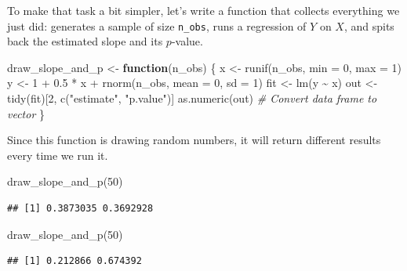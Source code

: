 \documentclass[
  12pt,
  oneside,openany]{book}
\newenvironment{Shaded}{\begin{snugshade}}{\end{snugshade}}
\newcommand{\AttributeTok}[1]{\textcolor[rgb]{0.77,0.63,0.00}{#1}}
\newcommand{\CommentTok}[1]{\textcolor[rgb]{0.56,0.35,0.01}{\textit{#1}}}
\newcommand{\ControlFlowTok}[1]{\textcolor[rgb]{0.13,0.29,0.53}{\textbf{#1}}}
\newcommand{\DecValTok}[1]{\textcolor[rgb]{0.00,0.00,0.81}{#1}}
\newcommand{\FloatTok}[1]{\textcolor[rgb]{0.00,0.00,0.81}{#1}}
\newcommand{\FunctionTok}[1]{\textcolor[rgb]{0.00,0.00,0.00}{#1}}
\newcommand{\NormalTok}[1]{#1}
\newcommand{\OtherTok}[1]{\textcolor[rgb]{0.56,0.35,0.01}{#1}}
\newcommand{\SpecialCharTok}[1]{\textcolor[rgb]{0.00,0.00,0.00}{#1}}
\newcommand{\StringTok}[1]{\textcolor[rgb]{0.31,0.60,0.02}{#1}}
\begin{document}
To make that task a bit simpler, let's write a function that collects everything we just did: generates a sample of size \texttt{n\_obs}, runs a regression of \(Y\) on \(X\), and spits back the estimated slope and its \(p\)-value.

\begin{Shaded}
\begin{Highlighting}[]
\NormalTok{draw\_slope\_and\_p }\OtherTok{\textless{}{-}} \ControlFlowTok{function}\NormalTok{(n\_obs) \{}
\NormalTok{    x }\OtherTok{\textless{}{-}} \FunctionTok{runif}\NormalTok{(n\_obs, }\AttributeTok{min =} \DecValTok{0}\NormalTok{, }\AttributeTok{max =} \DecValTok{1}\NormalTok{)}
\NormalTok{    y }\OtherTok{\textless{}{-}} \DecValTok{1} \SpecialCharTok{+} \FloatTok{0.5} \SpecialCharTok{*}\NormalTok{ x }\SpecialCharTok{+} \FunctionTok{rnorm}\NormalTok{(n\_obs, }\AttributeTok{mean =} \DecValTok{0}\NormalTok{, }\AttributeTok{sd =} \DecValTok{1}\NormalTok{)}
\NormalTok{    fit }\OtherTok{\textless{}{-}} \FunctionTok{lm}\NormalTok{(y }\SpecialCharTok{\textasciitilde{}}\NormalTok{ x)}
\NormalTok{    out }\OtherTok{\textless{}{-}} \FunctionTok{tidy}\NormalTok{(fit)[}\DecValTok{2}\NormalTok{, }\FunctionTok{c}\NormalTok{(}\StringTok{"estimate"}\NormalTok{, }\StringTok{"p.value"}\NormalTok{)]}
    \FunctionTok{as.numeric}\NormalTok{(out)  }\CommentTok{\# Convert data frame to vector}
\NormalTok{\}}
\end{Highlighting}
\end{Shaded}

Since this function is drawing random numbers, it will return different results every time we run it.

\begin{Shaded}
\begin{Highlighting}[]
\FunctionTok{draw\_slope\_and\_p}\NormalTok{(}\DecValTok{50}\NormalTok{)}
\end{Highlighting}
\end{Shaded}

\begin{verbatim}
## [1] 0.3873035 0.3692928
\end{verbatim}

\begin{Shaded}
\begin{Highlighting}[]
\FunctionTok{draw\_slope\_and\_p}\NormalTok{(}\DecValTok{50}\NormalTok{)}
\end{Highlighting}
\end{Shaded}

\begin{verbatim}
## [1] 0.212866 0.674392
\end{verbatim}
\end{document}
